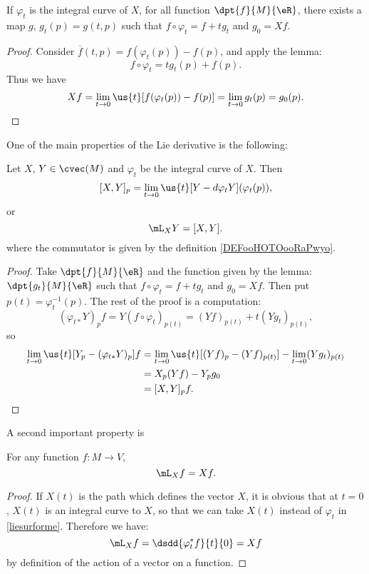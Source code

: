 \begin{lemma}
If $\varphi_t$ is the integral curve of $X$, for all function $\dpt{f}{M}{\eR}$, there exists a map $g$, $g_t(p)=g(t,p)$ such that
$f\circ\varphi_t=f+tg_t$ and $g_0=Xf$.
\end{lemma}

\begin{proof}
Consider $\overline{f}(t,p)=f(\varphi_t(p))-f(p)$, and apply the lemma:
\[
          f\circ\varphi_t=tg_t(p)+f(p).
\]
Thus we have
\[
      Xf=\lim_{t\to 0}\us{t}[f(\varphi_t(p))-f(p)]=\lim_{t\to 0}g_t(p)=g_0(p).
\]
\end{proof}

One of the main properties of the Lie derivative is the following:
\begin{theorem}		\label{ThoLieDerrComm}
Let $X$, $Y\in\cvec(M)$ and $\varphi_t$ be the integral curve of $X$. Then
\[
         [X,Y]_p=\lim_{t\to 0}\us{t}[Y-d\varphi_tY](\varphi_t(p)),
\]
or
\begin{equation}
          \mL_XY=[X,Y].
\end{equation}
where the commutator is given by the definition \ref{DEFooHOTOooRaPwyo}.
\end{theorem}
\begin{proof}
Take $\dpt{f}{M}{\eR}$ and the function given by the lemma: $\dpt{g_t}{M}{\eR}$ such that $f\circ \varphi_t=f+tg_t$ and $g_0=Xf$. Then put $p(t)=\varphi_t^{-1}(p)$. The rest of the proof is a computation:
\[
            (\varphi_{t*}Y)_pf=Y(f\circ\varphi_t)_{p(t)}=(Yf)_{p(t)}+t(Yg_t)_{p(t)},
\]
so
\begin{equation}
\begin{split}
  \lim_{t\to 0}\us{t}[Y_p-(\varphi_{t*}Y)_p]f&=\lim_{t\to 0}\us{t}[(Yf)_p-(Yf)_{p(t)}]-\lim_{t\to 0}(Yg_t)_{p(t)}\\
                                         &=X_p(Yf)-Y_pg_0\\
                                         &=[X,Y]_pf.
\end{split}
\end{equation}

\end{proof}

A second important property is
\begin{theorem}
For any function $f\colon M\to V$,
\[
           \mL_Xf=Xf.
\]
\end{theorem}

\begin{proof}
If $X(t)$ is the path which defines the vector $X$, it is obvious that at $t=0$, $X(t)$ is an integral curve to $X$, so that we can take $X(t)$ instead of $\varphi_t$ in \eqref{liesurforme}. Therefore we have:
\begin{equation}
    \mL_Xf=\dsdd{\varphi_t^*f}{t}{0}
          =Xf
\end{equation}
by definition of the action of a vector on a function.
\end{proof}
